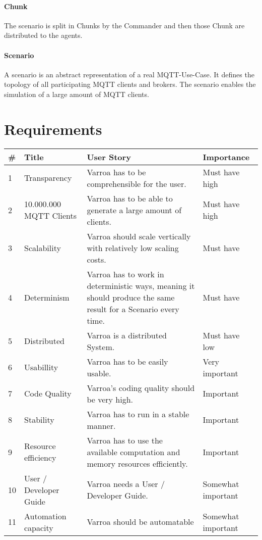\paragraph{Chunk}
The scenario is split in Chunks by the Commander and then those Chunk are distributed to the agents.

\paragraph{Scenario}
A scenario is an abstract representation of a real MQTT-Use-Case.
It defines the topology of all participating MQTT clients and brokers.
The scenario enables the simulation of a large amount of MQTT clients.





\section{Requirements}
\begin{table}
	\begin{tabular}{| l | l | p{5cm} | l |}
		\hline
		\rowcolor{Gray}
		\# & Title & User Story & Importance \\
		\hline
		1 & Transparency & Varroa has to be comprehensible for the user. & Must have high \\
		\hline
		2 & 10.000.000 MQTT Clients & Varroa has to be able to generate a large amount of clients. & Must have high \\
		\hline
		3 & Scalability & Varroa should scale vertically with relatively low scaling costs. & Must have \\
		\hline
		4 & Determinism & Varroa has to work in deterministic ways, meaning it should produce the same result for a Scenario every time. & Must have \\
		\hline
		5 & Distributed & Varroa is a distributed System. & Must have low \\
		\hline
		6 & Usabillity & Varroa has to be easily usable. & Very important \\
		\hline
		7 & Code Quality & Varroa's coding quality should be very high. & Important\\
		\hline
		8 & Stability & Varroa has to run in a stable manner. & Important \\
		\hline
		9 & Resource efficiency & Varroa has to use the available computation and memory resources efficiently. & Important\\
		\hline
		10 & User / Developer Guide & Varroa needs a User / Developer Guide. & Somewhat important \\
		\hline
		11 & Automation capacity & Varroa should be automatable & Somewhat important \\
		\hline
	\end{tabular}
\end{table}